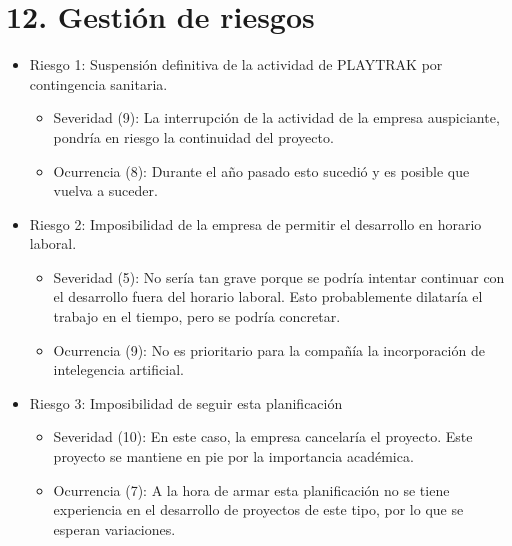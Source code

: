 \documentclass[11pt]{charter}
\begin{document}
\section{12. Gestión de riesgos}
\label{sec:riesgos}

\begin{itemize}
  \item Riesgo 1: Suspensión definitiva de la actividad de PLAYTRAK por contingencia sanitaria.
  \begin{itemize}
    \item Severidad (9): La interrupción de la actividad de la empresa auspiciante, pondría en riesgo la 
    continuidad del proyecto.
    \item Ocurrencia (8): Durante el año pasado esto sucedió y es posible que vuelva a suceder.
  \end{itemize}
\end{itemize}

\begin{itemize}
  \item Riesgo 2: Imposibilidad de la empresa de permitir el desarrollo en horario laboral.
  \begin{itemize}
    \item Severidad (5): No sería tan grave porque se podría intentar continuar con el desarrollo fuera del 
    horario laboral. Esto probablemente dilataría el trabajo en el tiempo, pero se podría concretar.
    \item Ocurrencia (9): No es prioritario para la compañía la incorporación de intelegencia artificial.
  \end{itemize}
\end{itemize}

\begin{itemize}
  \item Riesgo 3: Imposibilidad de seguir esta planificación
  \begin{itemize}
    \item Severidad (10): En este caso, la empresa cancelaría el proyecto. Este proyecto se mantiene en pie por 
    la importancia académica.
    \item Ocurrencia (7): A la hora de armar esta planificación no se tiene experiencia en el desarrollo
    de proyectos de este tipo, por lo que se esperan variaciones.
  \end{itemize}
\end{itemize}
\end{document}
